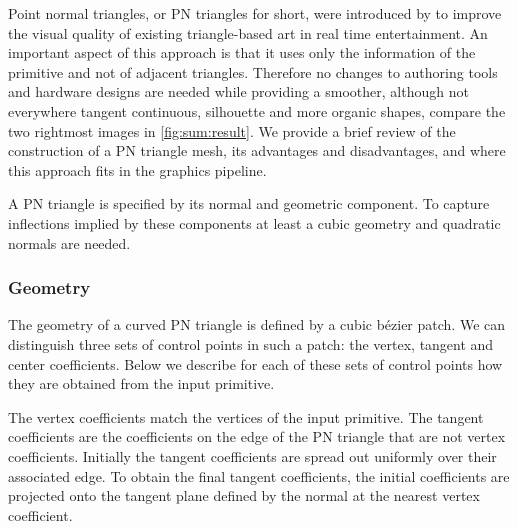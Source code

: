 \noindent Point normal triangles, or PN triangles for short, were introduced by \textcite{vlachos2001curved} to improve the visual quality of existing triangle-based art in real time entertainment. An important aspect of this approach is that it uses only the information of the primitive and not of adjacent triangles. Therefore no changes to authoring tools and hardware designs are needed while providing a smoother, although not everywhere tangent continuous, silhouette and more organic shapes, compare the two rightmost images in \cref{fig:sum:result}. We provide a brief review of the construction of a PN triangle mesh, its advantages and disadvantages, and where this approach fits in the graphics pipeline. 

\begin{figure*}
	\centering
	\caption{From left to right (a) Input triangulation, (b) Gouraud shaded input triangulation, (c) geometric component of the PN triangles (shaded according to surface normal variation), and (d) curved PN Triangles (shaded with independently constructed quadratically varying normals)}
	\label{fig:sum:result}
\end{figure*}

A PN triangle is specified by its normal and geometric component. To capture inflections implied by these components at least a cubic geometry and quadratic normals are needed.

\subsubsection*{Geometry}
The geometry of a curved PN triangle is defined by a cubic b\'ezier patch. We can distinguish three sets of control points in such a patch: the vertex, tangent and center coefficients. Below we describe for each of these sets of control points how they are obtained from the input primitive. 

The vertex coefficients match the vertices of the input primitive. The tangent coefficients are the coefficients on the edge of the PN triangle that are not vertex coefficients. Initially the tangent coefficients are spread out uniformly over their associated edge. To obtain the final tangent coefficients, the initial coefficients are projected onto the tangent plane defined by the normal at the nearest vertex coefficient. 

